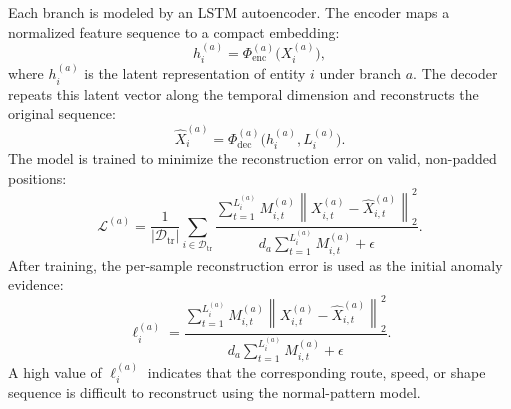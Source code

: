 Each branch is modeled by an LSTM autoencoder. The encoder maps a normalized feature sequence to a compact embedding:
\begin{equation}
  h_i^{(a)}=\Phi_{\mathrm{enc}}^{(a)}\big(X_i^{(a)}\big),
\end{equation}
where \(h_i^{(a)}\) is the latent representation of entity \(i\) under branch \(a\). The decoder repeats this latent vector along the temporal dimension and reconstructs the original sequence:
\begin{equation}
  \hat{X}_i^{(a)}=\Phi_{\mathrm{dec}}^{(a)}\big(h_i^{(a)},L_i^{(a)}\big).
\end{equation}
The model is trained to minimize the reconstruction error on valid, non-padded positions:
\begin{equation}
  \mathcal{L}^{(a)} =
  \frac{1}{|\mathcal{D}_{\mathrm{tr}}|}
  \sum_{i\in\mathcal{D}_{\mathrm{tr}}}
  \frac{
  \sum_{t=1}^{L_i^{(a)}} M_{i,t}^{(a)}
  \left\|X_{i,t}^{(a)}-\hat{X}_{i,t}^{(a)}\right\|_2^2
  }
  {
  d_a\sum_{t=1}^{L_i^{(a)}}M_{i,t}^{(a)}+\epsilon
  }.
\end{equation}
After training, the per-sample reconstruction error is used as the initial anomaly evidence:
\begin{equation}
  \ell_i^{(a)} =
  \frac{
  \sum_{t=1}^{L_i^{(a)}} M_{i,t}^{(a)}
  \left\|X_{i,t}^{(a)}-\hat{X}_{i,t}^{(a)}\right\|_2^2
  }
  {
  d_a\sum_{t=1}^{L_i^{(a)}}M_{i,t}^{(a)}+\epsilon
  }.
\end{equation}
A high value of \(\ell_i^{(a)}\) indicates that the corresponding route, speed, or shape sequence is difficult to reconstruct using the normal-pattern model.

